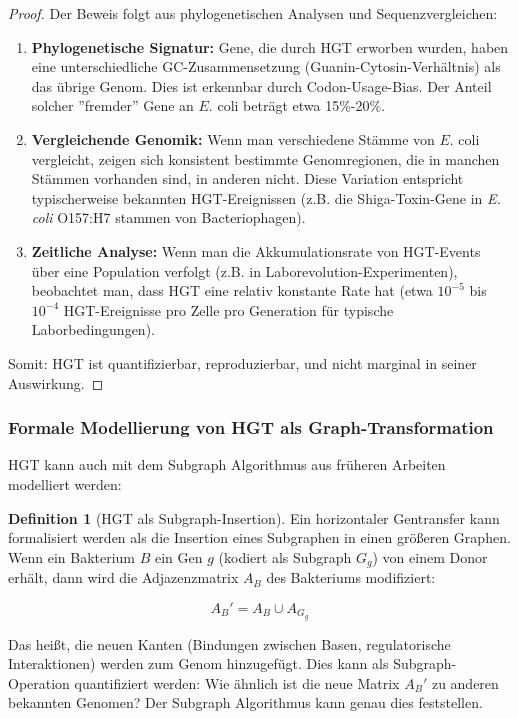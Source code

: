 \documentclass[a4paper,12pt]{article}
\theoremstyle{definition}
\newtheorem{definition}{Definition}
\begin{document}
\begin{proof}
Der Beweis folgt aus phylogenetischen Analysen und Sequenzvergleichen:

\begin{enumerate}
    \item \textbf{Phylogenetische Signatur:} Gene, die durch HGT erworben wurden, haben eine unterschiedliche GC-Zusammensetzung (Guanin-Cytosin-Verhältnis) als das übrige Genom. Dies ist erkennbar durch Codon-Usage-Bias. Der Anteil solcher ''fremder'' Gene an $E$. coli beträgt etwa 15\%-20\%.
    
    \item \textbf{Vergleichende Genomik:} Wenn man verschiedene Stämme von $E$. coli vergleicht, zeigen sich konsistent bestimmte Genomregionen, die in manchen Stämmen vorhanden sind, in anderen nicht. Diese Variation entspricht typischerweise bekannten HGT-Ereignissen (z.B. die Shiga-Toxin-Gene in \textit{E. coli} O157:H7 stammen von Bacteriophagen).
    
    \item \textbf{Zeitliche Analyse:} Wenn man die Akkumulationsrate von HGT-Events über eine Population verfolgt (z.B. in Laborevolution-Experimenten), beobachtet man, dass HGT eine relativ konstante Rate hat (etwa $10^{-5}$ bis $10^{-4}$ HGT-Ereignisse pro Zelle pro Generation für typische Laborbedingungen).
\end{enumerate}

Somit: HGT ist quantifizierbar, reproduzierbar, und nicht marginal in seiner Auswirkung.
\end{proof}

\subsubsection{Formale Modellierung von HGT als Graph-Transformation}

HGT kann auch mit dem Subgraph Algorithmus aus früheren Arbeiten modelliert werden:

\begin{definition}[HGT als Subgraph-Insertion]
Ein horizontaler Gentransfer kann formalisiert werden als die Insertion eines Subgraphen in einen größeren Graphen. Wenn ein Bakterium $B$ ein Gen $g$ (kodiert als Subgraph $G_g$) von einem Donor erhält, dann wird die Adjazenzmatrix $A_{B}$ des Bakteriums modifiziert:

\[
A_{B}' = A_{B} \cup A_{G_g}
\]

Das heißt, die neuen Kanten (Bindungen zwischen Basen, regulatorische Interaktionen) werden zum Genom hinzugefügt. Dies kann als Subgraph-Operation quantifiziert werden: Wie ähnlich ist die neue Matrix $A_{B}'$ zu anderen bekannten Genomen? Der Subgraph Algorithmus kann genau dies feststellen.
\end{definition}
\end{document}
